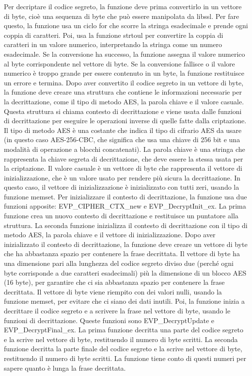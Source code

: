 Per decriptare il codice segreto, la funzione deve prima convertirlo in un vettore di byte, cioè una sequenza di byte che può essere manipolata da libssl. Per fare questo, la funzione usa un ciclo for che scorre la stringa esadecimale e prende ogni coppia di caratteri. Poi, usa la funzione strtoul per convertire la coppia di caratteri in un valore numerico, interpretando la stringa come un numero esadecimale. Se la conversione ha successo, la funzione assegna il valore numerico al byte corrispondente nel vettore di byte. Se la conversione fallisce o il valore numerico è troppo grande per essere contenuto in un byte, la funzione restituisce un errore e termina.
Dopo aver convertito il codice segreto in un vettore di byte, la funzione deve creare una struttura che contiene le informazioni necessarie per la decrittazione, come il tipo di metodo AES, la parola chiave e il valore casuale. Questa struttura si chiama contesto di decrittazione e viene usata dalle funzioni di decrittazione per eseguire le operazioni inverse di quelle fatte dalla criptazione. Il tipo di metodo AES è una costante che indica il tipo di cifrario AES da usare (in questo caso AES-256-CBC, che significa che usa una chiave di 256 bit e una modalità di operazione a blocchi concatenati). La parola chiave è una stringa che rappresenta la chiave segreta di decrittazione, che deve essere la stessa usata per la criptazione. Il valore casuale è un vettore di byte che rappresenta il vettore di inizializzazione, che è un valore usato per rendere più sicura la decrittazione. In questo caso, il vettore di inizializzazione è inizializzato con tutti zeri, usando la funzione memset.
Per inizializzare il contesto di decrittazione, la funzione usa due funzioni apposite: EVP\_CIPHER\_CTX\_new e EVP\_DecryptInit\_ex. La prima funzione crea un nuovo contesto di decrittazione e restituisce un puntatore alla struttura. La seconda funzione inizializza il contesto di decrittazione con il tipo di metodo AES, la parola chiave e il vettore di inizializzazione.
Dopo aver inizializzato il contesto di decrittazione, la funzione deve creare un vettore di byte che ha abbastanza spazio per contenere la frase decrittata. Il vettore di byte ha una dimensione pari alla lunghezza del codice segreto diviso due (perché ogni byte corrisponde a due caratteri esadecimali) più la dimensione di un blocco AES (16 byte), per garantire che ci sia abbastanza spazio per contenere la frase decrittata. Il vettore di byte viene riempito con dei valori nulli, usando la funzione memset, per evitare che ci siano dei dati inutili.
Poi, la funzione inizia a decrittare il codice segreto e a scrivere la frase nel vettore di byte, usando le funzioni di decrittazione. Queste funzioni sono EVP\_DecryptUpdate e EVP\_DecryptFinal\_ex. La prima funzione decritta una parte del codice segreto e la scrive nel vettore di byte, restituendo il numero di byte scritti. La seconda funzione decritta la parte finale del codice segreto e la scrive nel vettore di byte, restituendo il numero di byte scritti. La funzione tiene conto di questi numeri per sapere quanto è lunga la frase decrittata.
